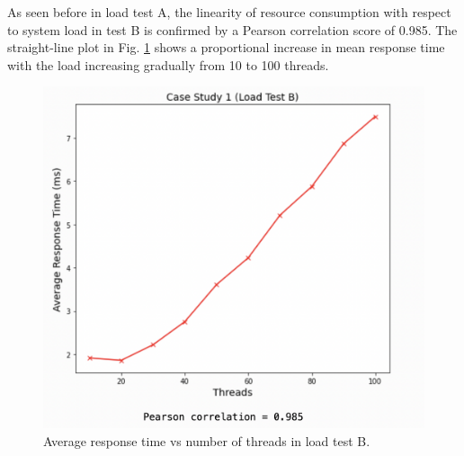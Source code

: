 As seen before in load test A, the linearity of resource consumption with respect to system load in test B is confirmed by a Pearson correlation score of 0.985. The straight-line plot in Fig. \ref{fig:cs01-ltb-4} shows a proportional increase in mean response time with the load increasing gradually from 10 to 100 threads.

\begin{figure}[H]
  \centering
  \includegraphics[width=0.55\linewidth]{./assets/images/case-studies/cs01-ltb-4.png}
  \caption{Average response time vs number of threads in load test B.}
  \label{fig:cs01-ltb-4}
\end{figure}